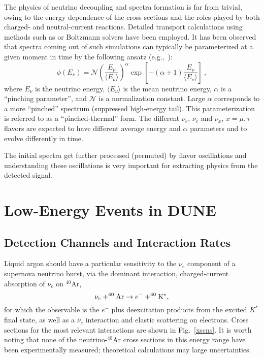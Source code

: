 The physics of neutrino decoupling and spectra formation is far from trivial, owing to the energy dependence of the cross sections and the roles played by both charged- and neutral-current reactions.
Detailed transport calculations using methods such as  or Boltzmann solvers have been employed. It has been observed that spectra coming out of such simulations can typically be parameterized at a given moment in time by the following ansatz (e.g.,~\cite{Minakata:2008nc,Tamborra:2012ac}):
\begin{equation}
        \label{eq:pinched}
        \phi(E_{\nu}) = \mathcal{N} 
        \left(\frac{E_{\nu}}{\langle E_{\nu} \rangle}\right)^{\alpha} \exp\left[-\left(\alpha + 1\right)\frac{E_{\nu}}{\langle E_{\nu} \rangle}\right] \ ,
\end{equation}
where $E_{\nu}$ is the neutrino energy, $\langle E_\nu \rangle$ is the
mean neutrino energy, $\alpha$ is a ``pinching parameter'', and
$\mathcal{N}$ is a normalization constant.
%
Large $\alpha$ corresponds to a more ``pinched'' spectrum (suppressed
high-energy tail). This parameterization is referred to as a
``pinched-thermal'' form. The different $\nu_e$, $\overline{\nu}_e$ and
$\nu_x, \, x = \mu, \tau$ flavors are expected to have different
average energy and $\alpha$ parameters and to evolve differently in
time. 

The initial spectra get further processed (permuted) by flavor oscillations and understanding these oscillations is very important for extracting physics from the detected signal.


\section{Low-Energy Events in DUNE}\label{sec:lowe-events}

\subsection{Detection Channels and Interaction Rates}

Liquid argon should have a particular sensitivity to the $\nu_e$
component of a supernova neutrino burst, via the dominant interaction,
charged-current
absorption of $\nu_e$ on $^{40}$Ar,
\begin{equation}
\nu_e + ^{40}{\rm Ar} \rightarrow e^- + ^{40}{\rm K^*},
\label{eq:nueabs}
\end{equation}
for which the observable is the $e^-$ plus deexcitation products from the excited $K^*$ final state, as well as a $\bar{\nu}_e$ interaction and elastic scattering on electrons.
Cross sections for the most
relevant interactions are shown in Fig.~\ref{xscns}.  It is worth
noting that none of the neutrino-$^{40}$Ar cross sections in this
energy range have been experimentally measured; theoretical
calculations may large uncertainties.

